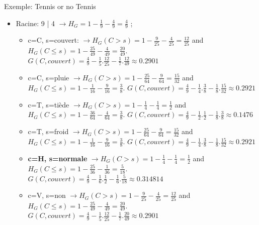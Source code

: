 \documentclass[8pt]{beamer}
\begin{document}
				\begin{frame}{Exemple: Tennis or no Tennis}
					\begin{itemize}
						\item<1-> Racine: 9 | 4 \(\longrightarrow H_G = 1 - \frac{1}{9} - \frac{4}{9} = \frac{4}{9}\) ;
							\begin{itemize}
								\small
								\item c=C, s=couvert: \(\longrightarrow H_G (C > s) = 1 - \frac{9}{25} - \frac{4}{25} = \frac{12}{25}\) and \(H_G (C \leq s) = 1- \frac{25}{49} - \frac{4}{49} = \frac{20}{49}\).
									\(G(C, couvert) = \frac{4}{9} - \frac{1}{5} . \frac{12}{25} - \frac{1}{7} . \frac{12}{49} \approx 0.2901\)
								\item c=C, s=pluie \(\longrightarrow H_G (C > s) = 1 - \frac{25}{64} - \frac{9}{64} = \frac{15}{32}\) and \(H_G (C \leq s) = 1- \frac{1}{16} - \frac{9}{16} = \frac{3}{8}\).
									\(G(C, couvert) = \frac{4}{9} - \frac{1}{4} . \frac{3}{8} - \frac{1}{8} . \frac{15}{32} \approx 0.2921\)
								\item c=T, s=tiède \(\longrightarrow H_G (C > s) = 1 - \frac{1}{4} - \frac{1}{4} = \frac{1}{2}\) and \(H_G (C \leq s) = 1- \frac{36}{64} - \frac{4}{64} = \frac{3}{8}\).
									\(G(C, couvert) = \frac{4}{9} - \frac{1}{2} . \frac{1}{2} - \frac{1}{8} . \frac{3}{8} \approx 0.1476\)
								\item c=T, s=froid \(\longrightarrow H_G (C > s) = 1 - \frac{25}{64} - \frac{9}{64} = \frac{15}{32}\) and \(H_G (C \leq s) = 1- \frac{1}{16} - \frac{9}{16} = \frac{3}{8}\).
									\(G(C, couvert) = \frac{4}{9} - \frac{1}{4} . \frac{3}{8} - \frac{1}{8} . \frac{15}{32} \approx 0.2921\)
								\item \textbf{c=H, s=normale} \(\longrightarrow H_G (C > s) = 1 - \frac{1}{4} - \frac{1}{4} = \frac{1}{2}\) and \(H_G (C \leq s) = 1- \frac{25}{36} - \frac{1}{36} = \frac{5}{18}\).
									\(G(C, couvert) = \frac{4}{9} - \frac{1}{6} . \frac{1}{2} - \frac{1}{6} . \frac{5}{18} \approx 0.314814\)
								\item c=V, s=non \(\longrightarrow H_G (C > s) = 1 - \frac{9}{25} - \frac{4}{25} = \frac{12}{25}\) and \(H_G (C \leq s) = 1- \frac{25}{49} - \frac{4}{49} = \frac{20}{49}\).
									\(G(C, couvert) = \frac{4}{9} - \frac{1}{5} . \frac{12}{25} - \frac{1}{7} . \frac{20}{49} \approx 0.2901\)
							\end{itemize}
					\end{itemize}
				\end{frame}
\end{document}
